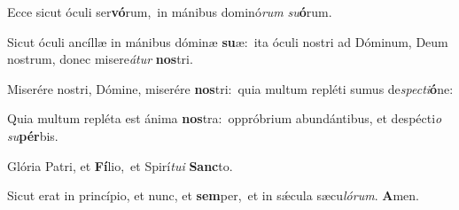 Ecce sicut óculi ser\textbf{vó}rum,~\redgreheightstar in mánibus dominó\textit{rum} \textit{su}\textbf{ó}rum.

Sicut óculi ancíllæ in mánibus dóminæ \textbf{su}æ:~\redgreheightstar ita óculi nostri ad Dóminum, Deum nostrum, donec misere\textit{á}\textit{tur} \textbf{nos}tri.

Miserére nostri, Dómine, miserére \textbf{nos}tri:~\redgreheightstar quia multum repléti sumus de\textit{spec}\textit{ti}\textbf{ó}ne:

Quia multum repléta est ánima \textbf{nos}tra:~\redgreheightstar oppróbrium abundántibus, et despécti\textit{o} \textit{su}\textbf{pér}bis.

Glória Patri, et \textbf{Fí}lio,~\redgreheightstar et Spirí\textit{tu}\textit{i} \textbf{Sanc}to.

Sicut erat in princípio, et nunc, et \textbf{sem}per,~\redgreheightstar et in sǽcula sæcu\textit{ló}\textit{rum}. \textbf{A}men.

